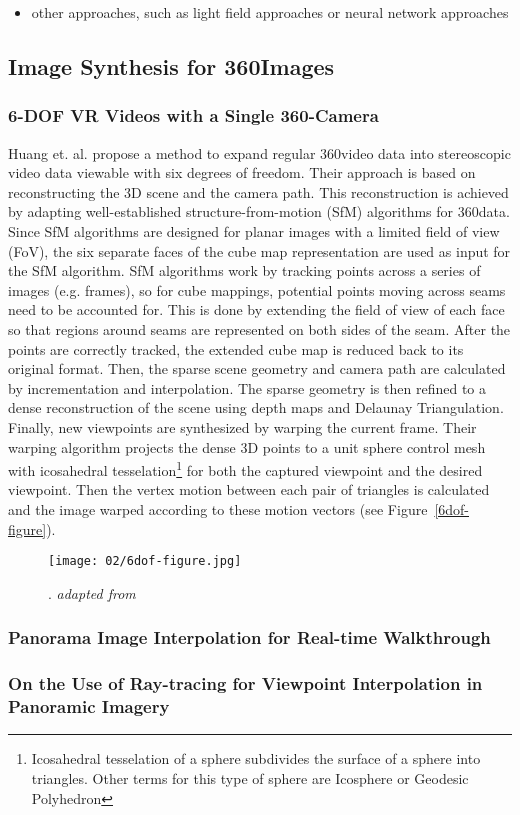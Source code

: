 \begin{itemize}
  \item other approaches, such as light field approaches or neural network approaches
\end{itemize}

\subsection{Image Synthesis for 360\degree Images}

\subsubsection{6-DOF VR Videos with a Single 360-Camera}
Huang et. al. \cite{6dof} propose a method to expand regular 360\degree video data into stereoscopic video data viewable with six degrees of freedom. Their approach is based on reconstructing the 3D scene and the camera path. This reconstruction is achieved by adapting well-established structure-from-motion (SfM) algorithms for 360\degree data. Since SfM algorithms are designed for planar images with a limited field of view (FoV), the six separate faces of the cube map representation are used as input for the SfM algorithm. SfM algorithms work by tracking points across a series of images (e.g. frames), so for cube mappings, potential points moving across seams need to be accounted for. This is done by extending the field of view of each face so that regions around seams are represented on both sides of the seam. After the points are correctly tracked, the extended cube map is reduced back to its original format. Then, the sparse scene geometry and camera path are calculated by incrementation and interpolation. The sparse geometry is then refined to a dense reconstruction of the scene using depth maps and Delaunay Triangulation. Finally, new viewpoints are synthesized by warping the current frame. Their warping algorithm projects the dense 3D points to a unit sphere control mesh with icosahedral tesselation\footnote{Icosahedral tesselation of a sphere subdivides the surface of a sphere into triangles. Other terms for this type of sphere are Icosphere or Geodesic Polyhedron} for both the captured viewpoint and the desired viewpoint. Then the vertex motion between each pair of triangles is calculated and the image warped according to these motion vectors (see Figure~\ref{6dof-figure}). 

\begin{figure}[]
\centering
\texttt{[image: 02/6dof-figure.jpg]}
\caption[Image warping from Huang et. al.]{. \emph{adapted from \cite{6dof}}}
\label{fig:megastereo-figure}
\end{figure}

\subsubsection{Panorama Image Interpolation for Real-time Walkthrough}
\cite{walkthrough}

\subsubsection{On the Use of Ray-tracing for Viewpoint Interpolation in Panoramic Imagery}
\cite{raytracing}

